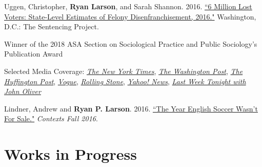 \documentclass[letterpaper]{article}
\renewenvironment{itemize}{
  \begin{list}{}{
    \setlength{\leftmargin}{1.5em}
  }
}{
  \end{list}
}
\begin{document}
\begin{itemize}
\item Uggen, Christopher, \textbf{Ryan Larson}, and Sarah Shannon. 2016. \href{http://www.sentencingproject.org/wp-content/uploads/2016/10/6-Million-Lost-Voters.pdf}{``6 Million Lost Voters: State-Level Estimates of Felony Disenfranchisement, 2016."} Washington, D.C.: The Sentencing Project.
\begin{itemize}
\item Winner of the 2018 ASA Section on Sociological Practice and Public Sociology's Publication Award
\item Selected Media Coverage: \href{http://www.nytimes.com/interactive/2016/10/06/us/unequal-effect-of-laws-that-block-felons-from-voting.html?_r=0}{\textit{The New York Times}}, \href{https://www.washingtonpost.com/news/powerpost/wp/2016/10/07/6-million-citizens-including-1-in-13-african-americans-are-blocked-from-voting-because-of-felonies/}{\textit{The Washington Post}}, \href{http://www.huffingtonpost.com/harlan-green/trump-the-terrible-demago_b_12392904.html}{\textit{The Huffington Post}}, \href{http://www.vogue.com/13489654/2016-presidential-election-felony-disenfranchisement/}{\textit{Vogue}}, \href{http://www.rollingstone.com/politics/features/six-million-adults-who-wont-influence-this-election-w443693}{\textit{Rolling Stone}}, \href{https://www.yahoo.com/news/more-6-million-americans-t-vote-election-105300558.html}{\textit{Yahoo! News}}, \href{https://www.youtube.com/watch?time_continue=2&v=NpPyLcQ2vdI}{\textit{Last Week Tonight with John Oliver}}
\end{itemize}

\item Lindner, Andrew and \textbf{Ryan P. Larson}. 2016. \href{http://journals.sagepub.com/doi/full/10.1177/1536504216685127}{``The Year English Soccer Wasn't For Sale."} \textit{Contexts Fall 2016}. 

\end{itemize}


\section*{\textbf{Works in Progress}}
\end{document}

